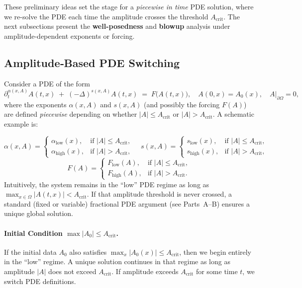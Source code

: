 \documentclass[12pt]{article}
\begin{document}
These preliminary ideas set the stage for a \emph{piecewise in time} PDE solution, 
where we re-solve the PDE each time the amplitude crosses the threshold 
$A_{\mathrm{crit}}$.  The next subsections present the \textbf{well-posedness} and 
\textbf{blowup} analysis under amplitude-dependent exponents or forcing.
\subsection{Amplitude‐Based PDE Switching}
\label{subsec:amplitude_switching}

Consider a PDE of the form
\[
\partial_t^{\alpha(x,A)} A(t,x)
\;+\;
(-\Delta)^{s(x,A)} A(t,x)
\;=\;
F\bigl(A(t,x)\bigr),
\quad
A(0,x)=A_0(x),
\quad
A|_{\partial\Omega}=0,
\]
where the exponents \(\alpha(x,A)\) and \(s(x,A)\) (and possibly the forcing \(F(A)\))
are defined \emph{piecewise} depending on whether \(\lvert A\rvert \le A_{\mathrm{crit}}\)
or \(\lvert A\rvert>A_{\mathrm{crit}}\).  A schematic example is:

\[
\alpha(x,A) 
=
\begin{cases}
\alpha_{\mathrm{low}}(x),
  & \text{if }\lvert A\rvert \le A_{\mathrm{crit}}, 
\\[4pt]
\alpha_{\mathrm{high}}(x),
  & \text{if }\lvert A\rvert > A_{\mathrm{crit}},
\end{cases}
\quad
s(x,A)
=
\begin{cases}
s_{\mathrm{low}}(x), 
  & \text{if }\lvert A\rvert \le A_{\mathrm{crit}}, 
\\[4pt]
s_{\mathrm{high}}(x), 
  & \text{if }\lvert A\rvert > A_{\mathrm{crit}},
\end{cases}
\]
\[
F(A)
=
\begin{cases}
F_{\mathrm{low}}(A),
  & \text{if }\lvert A\rvert \le A_{\mathrm{crit}}, 
\\[4pt]
F_{\mathrm{high}}(A),
  & \text{if }\lvert A\rvert > A_{\mathrm{crit}}.
\end{cases}
\]
Intuitively, the system remains in the “low” PDE regime as long as
\(\max_{x\in\Omega}\lvert A(t,x)\rvert < A_{\mathrm{crit}}\).  If that amplitude threshold
is never crossed, a standard (fixed or variable) fractional PDE argument (see
Parts~A--B) ensures a unique global solution.  

\paragraph{Initial Condition \(\max|A_0|\le A_{\mathrm{crit}}\).}
If the initial data \(A_0\) also satisfies \(\max_{x}\lvert A_0(x)\rvert \le A_{\mathrm{crit}}\),
then we begin entirely in the “low” regime.  A unique solution continues in that regime as
long as amplitude \(\lvert A\rvert\) does not exceed \(A_{\mathrm{crit}}\).  If amplitude
exceeds \(A_{\mathrm{crit}}\) for some time \(t\), we switch PDE definitions.
\end{document}
